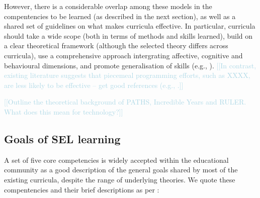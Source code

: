 \documentclass[prodmode,acmtochi]{acmsmall}
\newcommand{\todo}[1]{\textrm{\textrm{\textcolor{LightBlue}{[[#1]]} } } }
\begin{document}
However, there is a considerable overlap among these models in the compentencies to be learned (as described in the next section), as well as a shared set of guidelines on what makes curricula effective. In particular, curricula should take a wide scope (both in terms of methods and skills learned), build on a clear theoretical framework (although the selected theory differs across curricula), use a comprehensive approach intergrating affective, cognitive and behavioural dimensions, and promote generalisation of skills (e.g., \cite[p.119]{Elias1997}). \todo{In contrast, existing literature suggests that piecemeal programming efforts, such as XXXX, are less likely to be effective -- get good references (e.g., \cite[p.13]{Zins2004}.}


\todo{Outline the theoretical background of PATHS, Incredible Years and RULER. What does this mean for technology?}







\subsection{Goals of SEL learning}
\label{sec:blocks}



%

A set of five core competencies is widely accepted within the educational community \cite{Zins2007,Durlak2011,CASEL2003,CASEL2013} as a good description of the general goals shared by most of the existing curricula, despite the range of underlying theories. We quote these compentencies and their brief descriptions as per :
%
\end{document}
